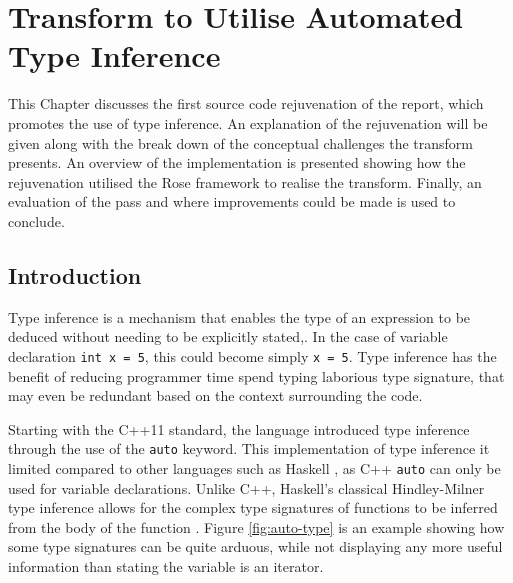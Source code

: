 \documentclass[bsc,frontabs,singlespacing,twoside,parskip,deptreport]{infthesis}
\begin{document}



\chapter{Transform to Utilise Automated Type Inference}\label{chp:auto-tranform}
This Chapter discusses the first source code rejuvenation of the report, which promotes the use of type inference. An explanation of the rejuvenation will be given along with the break down of the conceptual challenges the transform presents. An overview of the implementation is presented showing how the rejuvenation utilised the Rose framework to realise the transform. Finally, an evaluation of the pass and where improvements could be made is used to conclude.

\section{Introduction}
Type inference is a mechanism that enables the type of an expression to be deduced without needing to be explicitly stated,. In the case of variable declaration \texttt{int x = 5}, this could become simply \texttt{x = 5}. Type inference has the benefit of reducing programmer time spend typing laborious type signature, that may even be redundant based on the context surrounding the code. 


Starting with the C++11 standard, the language introduced type inference through the use of the \texttt{auto} keyword. This implementation of type inference it limited compared to other languages such as Haskell \cite{LYAHFGG_Lipovaca}, as C++ \texttt{auto} can only be used for variable declarations. Unlike C++, Haskell's classical Hindley-Milner type inference allows for the complex type signatures of functions to be inferred from the body of the function \cite{HASK_TYPE_INF}. Figure \ref{fig:auto-type} is an example  showing  how some type signatures can be quite arduous, while not displaying any more useful information than stating the variable is an iterator.
\end{document}
